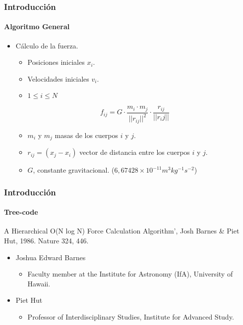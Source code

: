 \frame
{
\frametitle{Introducción}
\framesubtitle{Algoritmo General}

\begin{itemize}
    \item Cálculo de la fuerza.
    \begin{itemize}
        \item Posiciones iniciales $x_i$.
        \item Velocidades iniciales $v_i$.
        \item $1 \leq i \leq N$
    \end{itemize}
    $$f_{ij} =G \cdot \frac{m_i \cdot m_j}{||r_{ij}||^{2}} \cdot \frac{r_{ij}}{||r_ij||}$$
    \begin{itemize}
        \item $m_i$ y $m_j$ masas de los cuerpos $i$ y $j$.
        \item $r_{ij} = (x_j - x_i )$ vector de distancia entre los cuerpos $i$ y $j$.
        \item $G$, constante gravitacional. ($6,67428 \times 10^{-11} m^{3} kg^{-1} s^{-2}$)
    \end{itemize}
\end{itemize}
}

\frame
{
\frametitle{Introducción}
\framesubtitle{Tree-code}

\begin{center}
	A Hierarchical O(N log N) Force Calculation Algorithm', Josh Barnes \& Piet Hut, 1986. Nature 324, 446.
\end{center}
\begin{itemize}
	\item Joshua Edward Barnes
	\begin{itemize}
		\item Faculty member at the Institute for Astronomy (IfA), University of Hawaii.
	\end{itemize}
	\item Piet Hut
	\begin{itemize}
		\item Professor of Interdisciplinary Studies, Institute for Advanced Study.
	\end{itemize}
\end{itemize}
}

